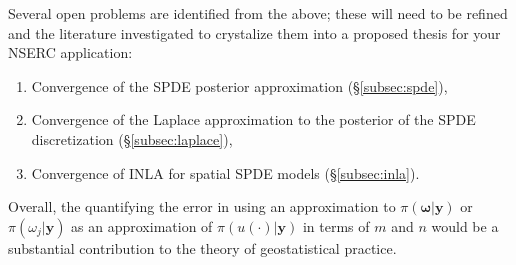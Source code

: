 \documentclass[12pt]{article}
\newcommand{\mb}[1]{\boldsymbol{#1}}
\newcommand{\response}{\mb{y}}
\begin{document}
Several open problems are identified from the above; these will need to be refined and the literature investigated to crystalize
them into a proposed thesis for your NSERC application:
\begin{enumerate}
  \item Convergence of the SPDE posterior approximation (\S\ref{subsec:spde}),
  \item Convergence of the Laplace approximation to the posterior of the SPDE discretization (\S\ref{subsec:laplace}),
  \item Convergence of INLA for spatial SPDE models (\S\ref{subsec:inla}).
\end{enumerate}
Overall, the quantifying the error in using an approximation to $\pi(\mb{\omega}|\response)$ or $\pi(\omega_j|\response)$ as an approximation of $\pi(u(\cdot)|\response)$ in terms of $m$ and $n$ would be a substantial contribution to the theory of geostatistical practice.




\end{document}
